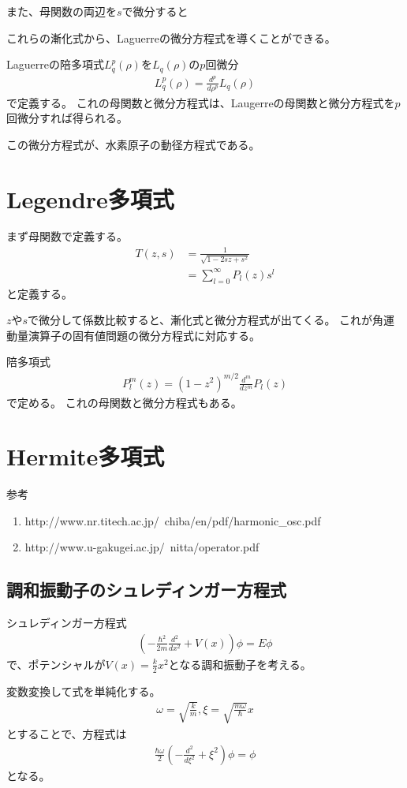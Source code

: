 \documentclass[uplatex]{jsarticle}
\begin{document}
また、母関数の両辺を$s$で微分すると

これらの漸化式から、Laguerreの微分方程式を導くことができる。

Laguerreの陪多項式$L_q^p(\rho)$を$L_q(\rho)$の$p$回微分
\begin{align*}
L_q^p(\rho)=\frac{d^p}{d\rho^p}L_q(\rho)
\end{align*}
で定義する。
これの母関数と微分方程式は、Laugerreの母関数と微分方程式を$p$回微分すれば得られる。

この微分方程式が、水素原子の動径方程式である。

\section{Legendre多項式}
まず母関数で定義する。
\begin{align*}
T(z,s)&=\frac{1}{\sqrt{1-2sz+s^2}}\\
&=\sum^\infty_{l=0}P_l(z)s^l
\end{align*}
と定義する。

$z$や$s$で微分して係数比較すると、漸化式と微分方程式が出てくる。
これが角運動量演算子の固有値問題の微分方程式に対応する。

陪多項式
\begin{align*}
P^m_l(z)=(1-z^2)^{m/2}\frac{d^m}{dz^m}P_l(z)
\end{align*}
で定める。
これの母関数と微分方程式もある。


\section{Hermite多項式}
参考
\begin{enumerate}
\item http://www.nr.titech.ac.jp/~chiba/en/pdf/harmonic\_osc.pdf
\item http://www.u-gakugei.ac.jp/~nitta/operator.pdf
\end{enumerate}

\subsection{調和振動子のシュレディンガー方程式}
シュレディンガー方程式
\begin{align*}
(-\frac{\hbar^2}{2m}\frac{d^2}{dx^2}+V(x))\phi=E\phi
\end{align*}
で、ポテンシャルが$V(x)=\frac{k}{2}x^2$となる調和振動子を考える。

変数変換して式を単純化する。
\begin{align*}
\omega=\sqrt{\frac{k}{m}}, \xi=\sqrt{\frac{m\omega}{\hbar}}x
\end{align*}
とすることで、方程式は
\begin{align*}
\frac{\hbar\omega}{2}(-\frac{d^2}{d\xi^2}+\xi^2)\phi=\phi
\end{align*}
となる。
\end{document}
